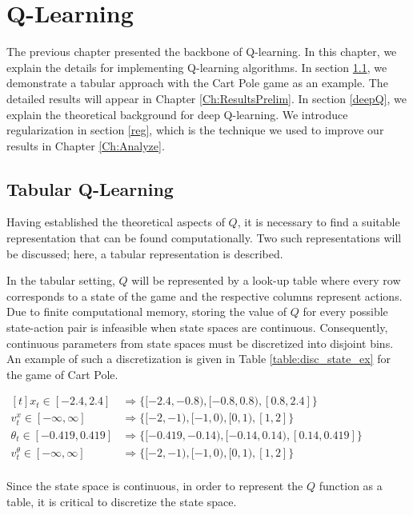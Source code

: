 \chapter{Q-Learning}\label{Ch:Q-Learning-Representations}

The previous chapter presented the backbone of Q-learning. In this chapter, we explain the details for implementing Q-learning algorithms. In section \ref{tabQ}, we demonstrate a tabular approach with the Cart Pole game as an example. The detailed results will appear in Chapter \ref{Ch:ResultsPrelim}. In section \ref{deepQ}, we explain the theoretical background for deep Q-learning. We introduce regularization in section \ref{reg}, which is the technique we used to improve our results in Chapter \ref{Ch:Analyze}.

\section{Tabular Q-Learning}\label{tabQ}
Having established the theoretical aspects of $Q$, it is necessary to find a 
suitable representation that can be found computationally. Two such 
representations will be discussed; here, a tabular representation is
described.

In the tabular setting, $Q$ will be represented by a look-up table where every
row corresponds to a state of the game and the respective columns represent
actions. Due to finite computational memory, storing the value of $Q$ for 
every possible state-action pair is infeasible when state spaces are continuous.
Consequently, continuous parameters from state spaces must be discretized into
disjoint bins. An example of such a discretization is given in Table 
\ref{table:disc_state_ex} for the game of Cart Pole.

\begin{table}[h!]
\centering
$\begin{aligned}[t]
x_t \in [-2.4, 2.4] &\Rightarrow {\{[-2.4, -0.8), [-0.8, 0.8), [0.8, 2.4]\}} \\
v_t^x \in [-\infty, \infty] &\Rightarrow {\{[-2, -1), [-1, 0),[0,1), [1, 2]\}}  \\
\theta_t \in [-0.419, 0.419] &\Rightarrow {\{[-0.419, -0.14), [-0.14, 0.14), [0.14, 0.419]\}}  \\
v_t^{\theta} \in [-\infty, \infty] &\Rightarrow {\{[-2, -1), [-1, 0), [0, 1), [1,2]\}} \\
\end{aligned}$
\caption[Discretized state space]{Since the state space is continuous, in order to represent the $Q$ function as a table, it is critical to discretize the state space.}
\label{table:disc_state_ex}
\end{table}

